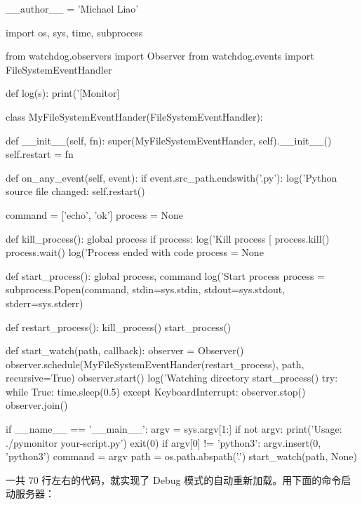 \begin{pythoncode}
__author__ = 'Michael Liao'

import os, sys, time, subprocess

from watchdog.observers import Observer
from watchdog.events import FileSystemEventHandler

def log(s):
    print('[Monitor] %

class MyFileSystemEventHander(FileSystemEventHandler):

    def __init__(self, fn):
        super(MyFileSystemEventHander, self).__init__()
        self.restart = fn

    def on_any_event(self, event):
        if event.src_path.endswith('.py'):
            log('Python source file changed: %
            self.restart()

command = ['echo', 'ok']
process = None

def kill_process():
    global process
    if process:
        log('Kill process [%
        process.kill()
        process.wait()
        log('Process ended with code %
        process = None

def start_process():
    global process, command
    log('Start process %
    process = subprocess.Popen(command, stdin=sys.stdin, stdout=sys.stdout, stderr=sys.stderr)

def restart_process():
    kill_process()
    start_process()

def start_watch(path, callback):
    observer = Observer()
    observer.schedule(MyFileSystemEventHander(restart_process), path, recursive=True)
    observer.start()
    log('Watching directory %
    start_process()
    try:
        while True:
            time.sleep(0.5)
    except KeyboardInterrupt:
        observer.stop()
    observer.join()

if __name__ == '__main__':
    argv = sys.argv[1:]
    if not argv:
        print('Usage: ./pymonitor your-script.py')
        exit(0)
    if argv[0] != 'python3':
        argv.insert(0, 'python3')
    command = argv
    path = os.path.abspath('.')
    start_watch(path, None)
\end{pythoncode}

一共 70 行左右的代码，就实现了 Debug
模式的自动重新加载。用下面的命令启动服务器：


